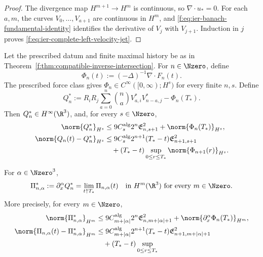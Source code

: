 \begin{proof}
The divergence map \(H^{m+1}\to H^m\) is continuous, so
\(\nabla\cdot u_*=0\).  For each \(a,m\), the curves
\(V_0,\ldots,V_{a+1}\) are continuous in \(H^m\), and
\eqref{f:eq:ier-banach-fundamental-identity} identifies the derivative of
\(V_j\) with \(V_{j+1}\).  Induction in \(j\) proves
\eqref{f:eq:ier-complete-left-velocity-jet}.
\end{proof}

\begin{theorem}
\label{f:thm:ier-pressure-complete-endpoint}
\begin{samepage}
Let the prescribed datum and finite maximal history be as in
Theorem~\ref{f:thm:compatible-inverse-intersection}.
For \(n\in\Nzero\), define
\[
 \Phi_n(t):=(-\Delta)^{-1}\nabla\cdot F_n(t).
\]
The prescribed force class gives
\(\Phi_n\in C^\infty([0,\infty);H^s)\) for every finite \(n,s\).  Define
\begin{equation}
 Q_n^*:=R_iR_j\sum_{a=0}^{n}\binom na
 V_{a,i}^*V_{n-a,j}^*-\Phi_n(T_*).
 \label{f:eq:ier-terminal-pressure-row}
\end{equation}
Then \(Q_n^*\in H^\infty(\R^3)\), and, for every \(s\in\Nzero\),
\begin{align}
 \norm{Q_n^*}_{H^s}
 &\le9C_s^{\rm alg}2^n\mathfrak E_{n,s+1}^2
 +\norm{\Phi_n(T_*)}_{H^s},
 \label{f:eq:ier-terminal-pressure-size}\\
 \norm{Q_n(t)-Q_n^*}_{H^s}
 &\le9C_s^{\rm alg}2^{n+1}(T_*-t)\mathfrak E_{n+1,s+1}^2\\
 &\quad +(T_*-t)
 \sup_{0\le r\le T_*}\norm{\Phi_{n+1}(r)}_{H^s}.
 \label{f:eq:ier-terminal-pressure-modulus}
\end{align}
\end{samepage}
For \(\alpha\in\Nzero^3\),
\begin{equation}
 \Pi_{n,\alpha}^*:=\partial_x^\alpha Q_n^*
 =\lim_{t\uparrow T_*}\Pi_{n,\alpha}(t)
 \quad\text{in }H^m(\R^3)\text{ for every }m\in\Nzero.
 \label{f:eq:ier-terminal-mixed-pressure-row}
\end{equation}
More precisely, for every \(m\in\Nzero\),
\begin{align}
 \norm{\Pi_{n,\alpha}^*}_{H^m}
 &\le9C_{m+|\alpha|}^{\rm alg}2^n
 \mathfrak E_{n,m+|\alpha|+1}^2
 +\norm{\partial_x^\alpha\Phi_n(T_*)}_{H^m},
 \label{f:eq:ier-terminal-mixed-pressure-size}\\
 \norm{\Pi_{n,\alpha}(t)-\Pi_{n,\alpha}^*}_{H^m}
 &\le9C_{m+|\alpha|}^{\rm alg}2^{n+1}(T_*-t)
 \mathfrak E_{n+1,m+|\alpha|+1}^2\\
 &\quad +(T_*-t)\sup_{0\le r\le T_*}

\end{align}
\end{theorem}
